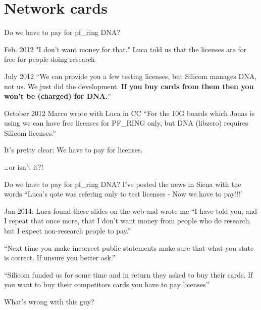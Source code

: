 \section*{Network cards}

\begin{frame}{Do we have to pay for pf_ring DNA?}{}
	\begin{block}{Feb. 2012 "I don't want money for that."}
		Luca told us that the licenses are for free for people doing research
	\end{block}
	
	\begin{block}{July 2012}
		``We can provide you a few testing licenses, but Silicom manages DNA, not us. We just did the development. 
		\textbf{If you buy cards from them then you won't be (charged) for DNA.}''
	\end{block}
	
	\begin{block}{October 2012 Marco wrote with Luca in CC}
			``For the 10G boards which Jonas is using we can have free licenses for
			PF\_RING only, but DNA (libzero) requires Silicom licenses.''
	\end{block}
	
	\begin{ergo}
		It's pretty clear: We have to pay for licenses. 
		
		\ldots or isn't it?!
	\end{ergo}
\end{frame}

\begin{frame}{Do we have to pay for pf_ring DNA?}{}
	I've posted the news in Siena with the words ``Luca's qote was refering only to
	test licenses - Now we have to pay!!!'
	
		\begin{block}{Jan 2014: Luca found these slides on the web and wrote me}
			``I have told you, and I repeat that once more, that I don’t want money from
			people who do research, but I expect non-research people to pay.''
			
			``Next time you make incorrect public statements make sure that what you state
			is correct. If unsure you better ask.''
			
			``Silicom funded us for some time and in return they asked to buy their
			cards. If you want to buy their competitors cards you have to pay licenses''
	\end{block}
	
	\begin{ergo}
		What's wrong with this guy?
	\end{ergo}

\end{frame}

